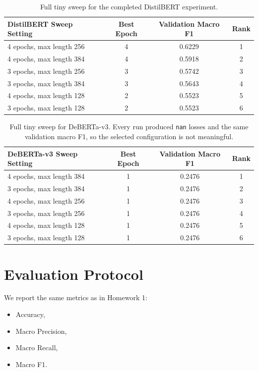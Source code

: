 \begin{table}[h]
\centering
\small
\begin{tabular}{lccc}
\toprule
DistilBERT Sweep Setting & Best Epoch & Validation Macro F1 & Rank \\
\midrule
4 epochs, max length 256 & 4 & 0.6229 & 1 \\
4 epochs, max length 384 & 4 & 0.5918 & 2 \\
3 epochs, max length 256 & 3 & 0.5742 & 3 \\
3 epochs, max length 384 & 3 & 0.5643 & 4 \\
4 epochs, max length 128 & 2 & 0.5523 & 5 \\
3 epochs, max length 128 & 2 & 0.5523 & 6 \\
\bottomrule
\end{tabular}
\caption{Full tiny sweep for the completed DistilBERT experiment.}
\label{tab:distilbert-sweep-full}
\end{table}

\begin{table}[h]
\centering
\small
\begin{tabular}{lccc}
\toprule
DeBERTa-v3 Sweep Setting & Best Epoch & Validation Macro F1 & Rank \\
\midrule
4 epochs, max length 384 & 1 & 0.2476 & 1 \\
3 epochs, max length 384 & 1 & 0.2476 & 2 \\
4 epochs, max length 256 & 1 & 0.2476 & 3 \\
3 epochs, max length 256 & 1 & 0.2476 & 4 \\
4 epochs, max length 128 & 1 & 0.2476 & 5 \\
3 epochs, max length 128 & 1 & 0.2476 & 6 \\
\bottomrule
\end{tabular}
\caption{Full tiny sweep for DeBERTa-v3. Every run produced \texttt{nan} losses and the same validation macro F1, so the selected configuration is not meaningful.}
\label{tab:deberta-sweep-full}
\end{table}

\section{Evaluation Protocol}

We report the same metrics as in Homework 1:
\begin{itemize}
	\item Accuracy,
	\item Macro Precision,
	\item Macro Recall,
	\item Macro F1.
\end{itemize}

